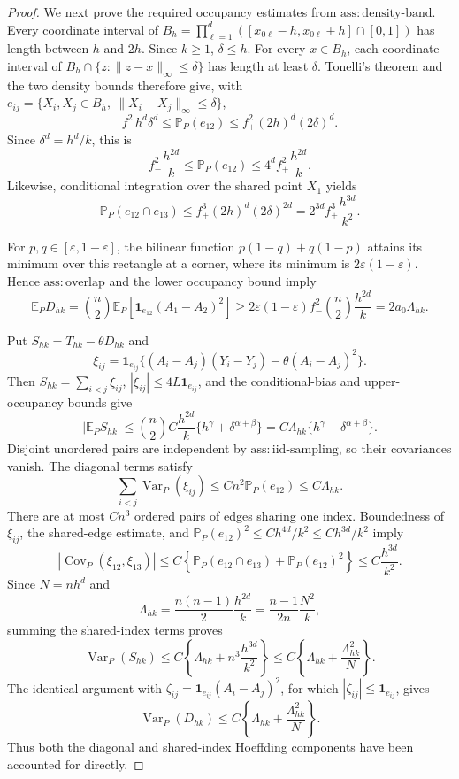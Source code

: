 \documentclass{article}
\begin{document}
\begin{proof}
We next prove the required occupancy estimates from \(\mathrm{ass:density\mbox{-}band}\).  Every coordinate interval of
\(B_h=\prod_{\ell=1}^d([x_{0\ell}-h,x_{0\ell}+h]\cap[0,1])\)
has length between \(h\) and \(2h\).  Since \(k\geq1\), \(\delta\leq h\).  For every \(x\in B_h\), each coordinate interval of
\(B_h\cap\{z:\lVert z-x\rVert_\infty\leq\delta\}\)
has length at least \(\delta\).  Tonelli's theorem and the two density bounds therefore give, with \(e_{ij}=\{X_i,X_j\in B_h,\ \lVert X_i-X_j\rVert_\infty\leq\delta\}\),
\[
 f_{-}^2h^d\delta^d
 \leq \mathbb P_P(e_{12})
 \leq f_{+}^2(2h)^d(2\delta)^d.
\]
Since \(\delta^d=h^d/k\), this is
\[
 f_{-}^2\frac{h^{2d}}{k}
 \leq \mathbb P_P(e_{12})
 \leq 4^d f_{+}^2\frac{h^{2d}}{k}.
\]
Likewise, conditional integration over the shared point \(X_1\) yields
\[
 \mathbb P_P(e_{12}\cap e_{13})
 \leq f_{+}^3(2h)^d(2\delta)^{2d}
 =2^{3d}f_{+}^3\frac{h^{3d}}{k^2}.
\]

For \(p,q\in[\varepsilon,1-\varepsilon]\), the bilinear function
\(p(1-q)+q(1-p)\) attains its minimum over this rectangle at a corner, where its minimum is \(2\varepsilon(1-\varepsilon)\).  Hence \(\mathrm{ass:overlap}\) and the lower occupancy bound imply
\[
 \mathbb E_P D_{hk}
 =\binom n2\mathbb E_P\left[\mathbf 1_{e_{12}}(A_1-A_2)^2\right]
 \geq2\varepsilon(1-\varepsilon)f_{-}^2\binom n2\frac{h^{2d}}{k}
 =2a_0\Lambda_{hk}.
\]

Put \(S_{hk}=T_{hk}-\theta D_{hk}\) and
\[
 \xi_{ij}=\mathbf 1_{e_{ij}}\bigl\{(A_i-A_j)(Y_i-Y_j)-\theta(A_i-A_j)^2\bigr\}.
\]
Then \(S_{hk}=\sum_{i<j}\xi_{ij}\), \(|\xi_{ij}|\leq4L\mathbf 1_{e_{ij}}\), and the conditional-bias and upper-occupancy bounds give
\[
 |\mathbb E_P S_{hk}|
 \leq\binom n2 C\frac{h^{2d}}{k}\{h^\gamma+\delta^{\alpha+\beta}\}
 =C\Lambda_{hk}\{h^\gamma+\delta^{\alpha+\beta}\}.
\]
Disjoint unordered pairs are independent by \(\mathrm{ass:iid\mbox{-}sampling}\), so their covariances vanish.  The diagonal terms satisfy
\[
 \sum_{i<j}\operatorname{Var}_P(\xi_{ij})
 \leq Cn^2\mathbb P_P(e_{12})
 \leq C\Lambda_{hk}.
\]
There are at most \(Cn^3\) ordered pairs of edges sharing one index.  Boundedness of \(\xi_{ij}\), the shared-edge estimate, and
\(\mathbb P_P(e_{12})^2\leq C h^{4d}/k^2\leq C h^{3d}/k^2\) imply
\[
 \left|\operatorname{Cov}_P(\xi_{12},\xi_{13})\right|
 \leq C\left\{\mathbb P_P(e_{12}\cap e_{13})+\mathbb P_P(e_{12})^2\right\}
 \leq C\frac{h^{3d}}{k^2}.
\]
Since \(N=nh^d\) and
\[
 \Lambda_{hk}=\frac{n(n-1)}{2}\frac{h^{2d}}{k}
 =\frac{n-1}{2n}\frac{N^2}{k},
\]
summing the shared-index terms proves
\[
 \operatorname{Var}_P(S_{hk})
 \leq C\left\{\Lambda_{hk}+n^3\frac{h^{3d}}{k^2}\right\}
 \leq C\left\{\Lambda_{hk}+\frac{\Lambda_{hk}^2}{N}\right\}.
\]
The identical argument with
\(\zeta_{ij}=\mathbf 1_{e_{ij}}(A_i-A_j)^2\), for which \(|\zeta_{ij}|\leq\mathbf 1_{e_{ij}}\), gives
\[
 \operatorname{Var}_P(D_{hk})
 \leq C\left\{\Lambda_{hk}+\frac{\Lambda_{hk}^2}{N}\right\}.
\]
Thus both the diagonal and shared-index Hoeffding components have been accounted for directly.


\end{proof}
\end{document}

